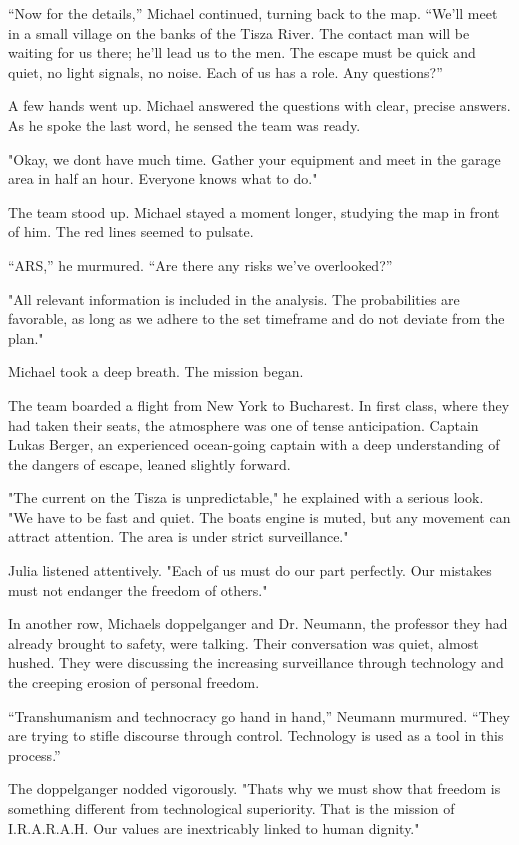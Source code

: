 \documentclass[
]{article}
\begin{document}
``Now for the details,'' Michael continued, turning back to the map. ``We'll meet in a small village on the banks of the Tisza River. The contact man will be waiting for us there; he'll lead us to the men. The escape must be quick and quiet, no light signals, no noise. Each of us has a role. Any questions?''

A few hands went up. Michael answered the questions with clear, precise answers. As he spoke the last word, he sensed the team was ready.

"Okay, we don\textquotesingle t have much time. Gather your equipment and meet in the garage area in half an hour. Everyone knows what to do."

The team stood up. Michael stayed a moment longer, studying the map in front of him. The red lines seemed to pulsate.

``ARS,'' he murmured. ``Are there any risks we've overlooked?''

"All relevant information is included in the analysis. The probabilities are favorable, as long as we adhere to the set timeframe and do not deviate from the plan."

Michael took a deep breath. The mission began.

The team boarded a flight from New York to Bucharest. In first class, where they had taken their seats, the atmosphere was one of tense anticipation. Captain Lukas Berger, an experienced ocean-going captain with a deep understanding of the dangers of escape, leaned slightly forward.

"The current on the Tisza is unpredictable," he explained with a serious look. "We have to be fast and quiet. The boat\textquotesingle s engine is muted, but any movement can attract attention. The area is under strict surveillance."

Julia listened attentively. "Each of us must do our part perfectly. Our mistakes must not endanger the freedom of others."

In another row, Michael\textquotesingle s doppelganger and Dr. Neumann, the professor they had already brought to safety, were talking. Their conversation was quiet, almost hushed. They were discussing the increasing surveillance through technology and the creeping erosion of personal freedom.

``Transhumanism and technocracy go hand in hand,'' Neumann murmured. ``They are trying to stifle discourse through control. Technology is used as a tool in this process.''

The doppelganger nodded vigorously. "That\textquotesingle s why we must show that freedom is something different from technological superiority. That is the mission of I.R.A.R.A.H. Our values \hspace{0pt}\hspace{0pt}are inextricably linked to human dignity."
\end{document}
